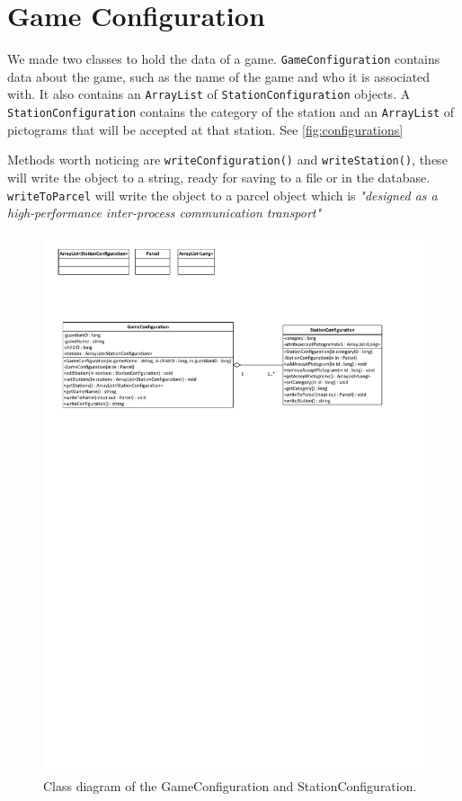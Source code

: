 \section{Game Configuration}
\label{gameconfiguration}
We made two classes to hold the data of a game. \lstinline|GameConfiguration| contains data about the game, such as the name of the game and who it is associated with. It also contains an \lstinline|ArrayList| of \lstinline|StationConfiguration| objects. A \lstinline|StationConfiguration| contains the category of the station and an \lstinline|ArrayList| of pictograms that will be accepted at that station. See \autoref{fig:configurations}

Methods worth noticing are \lstinline|writeConfiguration()| and \lstinline|writeStation()|, these will write the object to a string, ready for saving to a file or in the database. \lstinline|writeToParcel| will write the object to a parcel object which is \textit{"designed as a high-performance inter-process communication transport"}\citep{parcel}
\begin{figure}[H]
\includegraphics[width=1.0\linewidth,page=2]{img/configurations.pdf}%
\caption{Class diagram of the GameConfiguration and StationConfiguration.}
\label{fig:configurations}
\end{figure}

